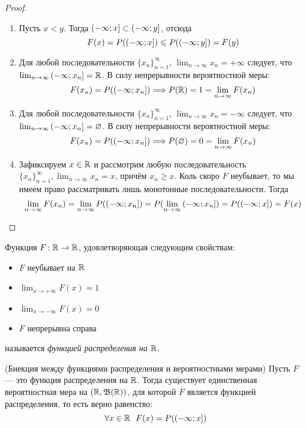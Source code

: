 \begin{proof}~
	\begin{enumerate}
		\item Пусть $x < y$. Тогда $\left(-\infty; x\right] \subset \left(-\infty; y\right]$, отсюда
		\[
			F(x) = P(\left(-\infty; x\right]) \leqslant P(\left(-\infty; y\right]) = F(y)
		\]
		
		\item Для любой последовательности $\{x_n\}_{n = 1}^\infty$, $\lim_{n \to \infty} x_n = +\infty$ следует, что $\lim_{n \to \infty} \left(-\infty; x_n\right] = \mathbb{R}$. В силу непрерывности вероятностной меры:
		\[
			F(x_n) = P(\left(-\infty; x_n\right]) \Longrightarrow P(\mathbb{R}) = 1 = \lim_{n \to \infty} F(x_n)
		\]
		
		\item Для любой последовательности $\{x_n\}_{n = 1}^\infty$, $\lim_{n \to \infty} x_n = -\infty$ следует, что $\lim_{n \to \infty} \left(-\infty; x_n\right] = \varnothing$. В силу непрерывности вероятностной меры:
		\[
			F(x_n) = P(\left(-\infty; x_n\right]) \Longrightarrow P(\varnothing) = 0 = \lim_{n \to \infty} F(x_n)
		\]
		
		\item Зафиксируем $x \in \mathbb{R}$ и рассмотрим любую последовательность $\{x_n\}_{n = 1}^\infty, \lim_{n \to \infty} x_n = x$, причём $x_n \ge x$. Коль скоро $F$ неубывает, то мы имеем право рассматривать лишь монотонные последовательности. Тогда
		\[
			\lim_{n \to \infty} F(x_n) = \lim_{n \to \infty} P(\left(-\infty; x_n\right]) = P(\lim_{n \to \infty} \left(-\infty; x_n\right]) = P(\left(-\infty; x\right]) = F(x)
		\]
	\end{enumerate}
\end{proof}

\begin{definition}
	Функция $F \colon \mathbb{R} \to \mathbb{R}$, удовлетворяющая следующим свойствам:
	\begin{itemize}
		\item $F$ неубывает на $\mathbb{R}$
		
		\item $\lim_{x \to +\infty} F(x) = 1$
		
		\item $\lim_{x \to -\infty} F(x) = 0$
		
		\item $F$ непрерывна справа
	\end{itemize}
	называется \textit{функцией распределения на $\mathbb{R}$}.
\end{definition}

\begin{theorem} (Биекция между функциями распределения и вероятностными мерами)
	Пусть $F$ --- это функция распределения на $\mathbb{R}$. Тогда существует единственная вероятностная мера на $(\mathbb{R}, \mathfrak{B}(\mathbb{R}))$, для которой $F$ является функцией распределения, то есть верно равенство:
	\[
		\forall x \in \mathbb{R}\ \ F(x) = P(\left(-\infty; x\right])
	\]
\end{theorem}

